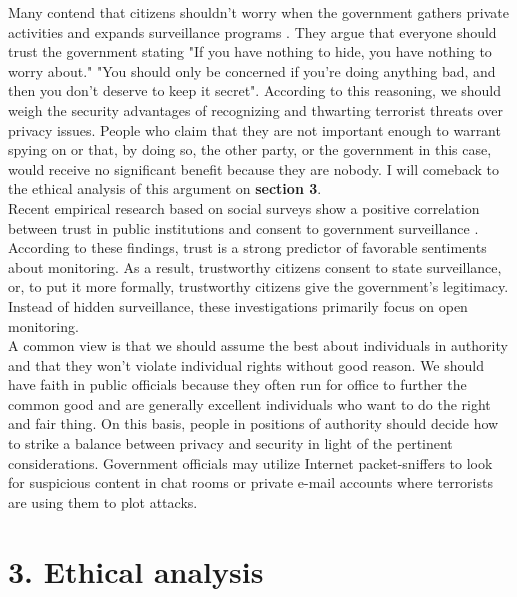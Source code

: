\documentclass[11pt]{report}
\begin{document}
Many contend that citizens shouldn't worry when the government gathers private activities and expands surveillance programs \cite{legitimizing_surveillance}. They argue that everyone should trust the government stating "If you have nothing to hide, you have nothing to worry about." "You should only be concerned if you're doing anything bad, and then you don't deserve to keep it secret"\cite{govt_survellience}\cite{govt_take_on_survellience}. According to this reasoning, we should weigh the security advantages of recognizing and thwarting terrorist threats over privacy issues. People who claim that they are not important enough to warrant spying on or that, by doing so, the other party, or the government in this case, would receive no significant benefit because they are nobody. I will comeback to the ethical analysis of this argument on \textbf{section 3}. \\

Recent empirical research based on social surveys show a positive correlation between trust in public institutions and consent to government surveillance \cite{acceptedAmericans}\cite{pavone}. According to these findings, trust is a strong predictor of favorable sentiments about monitoring. As a result, trustworthy citizens consent to state surveillance, or, to put it more formally, trustworthy citizens give the government's legitimacy. Instead of hidden surveillance, these investigations primarily focus on open monitoring. \\

A common view is that we should assume the best about individuals in authority and that they won't violate individual rights without good reason. We should have faith in public officials because they often run for office to further the common good and are generally excellent individuals who want to do the right and fair thing. On this basis, people in positions of authority should decide how to strike a balance between privacy and security in light of the pertinent considerations. Government officials may utilize Internet packet-sniffers to look for suspicious content in chat rooms or private e-mail accounts where terrorists are using them to plot attacks.

\section*{3. Ethical analysis}
\end{document}
